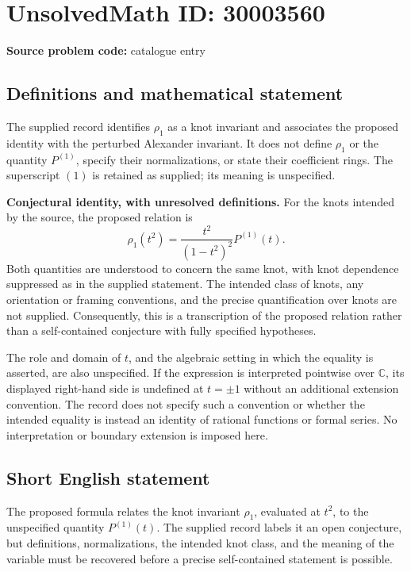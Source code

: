 \documentclass[11pt]{article}
\newcommand{\C}{\mathbb{C}}
\begin{document}
\section*{UnsolvedMath ID: 30003560}
\textbf{Source problem code:} catalogue entry
\subsection{Definitions and mathematical statement}
The supplied record identifies $\rho_1$ as a knot invariant and associates the proposed identity with the perturbed Alexander invariant. It does not define $\rho_1$ or the quantity $P^{(1)}$, specify their normalizations, or state their coefficient rings. The superscript $(1)$ is retained as supplied; its meaning is unspecified.

\textbf{Conjectural identity, with unresolved definitions.} For the knots intended by the source, the proposed relation is
\[
\rho_1(t^2)=\frac{t^2}{(1-t^2)^2}P^{(1)}(t).
\]
Both quantities are understood to concern the same knot, with knot dependence suppressed as in the supplied statement. The intended class of knots, any orientation or framing conventions, and the precise quantification over knots are not supplied. Consequently, this is a transcription of the proposed relation rather than a self-contained conjecture with fully specified hypotheses.

The role and domain of $t$, and the algebraic setting in which the equality is asserted, are also unspecified. If the expression is interpreted pointwise over $\C$, its displayed right-hand side is undefined at $t=\pm1$ without an additional extension convention. The record does not specify such a convention or whether the intended equality is instead an identity of rational functions or formal series. No interpretation or boundary extension is imposed here.
\subsection{Short English statement}
The proposed formula relates the knot invariant $\rho_1$, evaluated at $t^2$, to the unspecified quantity $P^{(1)}(t)$. The supplied record labels it an open conjecture, but definitions, normalizations, the intended knot class, and the meaning of the variable must be recovered before a precise self-contained statement is possible.
\end{document}
